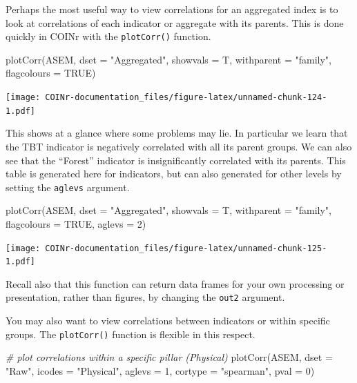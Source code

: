 \documentclass[
]{book}
\newenvironment{Shaded}{\begin{snugshade}}{\end{snugshade}}
\newcommand{\AttributeTok}[1]{\textcolor[rgb]{0.77,0.63,0.00}{#1}}
\newcommand{\CommentTok}[1]{\textcolor[rgb]{0.56,0.35,0.01}{\textit{#1}}}
\newcommand{\ConstantTok}[1]{\textcolor[rgb]{0.00,0.00,0.00}{#1}}
\newcommand{\DecValTok}[1]{\textcolor[rgb]{0.00,0.00,0.81}{#1}}
\newcommand{\FunctionTok}[1]{\textcolor[rgb]{0.00,0.00,0.00}{#1}}
\newcommand{\NormalTok}[1]{#1}
\newcommand{\StringTok}[1]{\textcolor[rgb]{0.31,0.60,0.02}{#1}}
\begin{document}
Perhaps the most useful way to view correlations for an aggregated index is to look at correlations of each indicator or aggregate with its parents. This is done quickly in COINr with the \texttt{plotCorr()} function.

\begin{Shaded}
\begin{Highlighting}[]
\FunctionTok{plotCorr}\NormalTok{(ASEM, }\AttributeTok{dset =} \StringTok{"Aggregated"}\NormalTok{, }\AttributeTok{showvals =}\NormalTok{ T, }\AttributeTok{withparent =} \StringTok{"family"}\NormalTok{, }\AttributeTok{flagcolours =} \ConstantTok{TRUE}\NormalTok{)}
\end{Highlighting}
\end{Shaded}

\texttt{[image: COINr-documentation\_files/figure-latex/unnamed-chunk-124-1.pdf]}

This shows at a glance where some problems may lie. In particular we learn that the TBT indicator is negatively correlated with all its parent groups. We can also see that the ``Forest'' indicator is insignificantly correlated with its parents. This table is generated here for indicators, but can also generated for other levels by setting the \texttt{aglevs} argument.

\begin{Shaded}
\begin{Highlighting}[]
\FunctionTok{plotCorr}\NormalTok{(ASEM, }\AttributeTok{dset =} \StringTok{"Aggregated"}\NormalTok{, }\AttributeTok{showvals =}\NormalTok{ T, }\AttributeTok{withparent =} \StringTok{"family"}\NormalTok{, }\AttributeTok{flagcolours =} \ConstantTok{TRUE}\NormalTok{, }\AttributeTok{aglevs =} \DecValTok{2}\NormalTok{)}
\end{Highlighting}
\end{Shaded}

\texttt{[image: COINr-documentation\_files/figure-latex/unnamed-chunk-125-1.pdf]}

Recall also that this function can return data frames for your own processing or presentation, rather than figures, by changing the \texttt{out2} argument.

You may also want to view correlations between indicators or within specific groups. The \texttt{plotCorr()} function is flexible in this respect.

\begin{Shaded}
\begin{Highlighting}[]
\CommentTok{\# plot correlations within a specific pillar (Physical)}
\FunctionTok{plotCorr}\NormalTok{(ASEM, }\AttributeTok{dset =} \StringTok{"Raw"}\NormalTok{, }\AttributeTok{icodes =} \StringTok{"Physical"}\NormalTok{, }\AttributeTok{aglevs =} \DecValTok{1}\NormalTok{, }\AttributeTok{cortype =} \StringTok{"spearman"}\NormalTok{, }\AttributeTok{pval =} \DecValTok{0}\NormalTok{)}
\end{Highlighting}
\end{Shaded}
\end{document}
